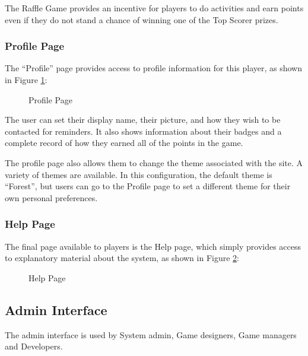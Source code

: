 The Raffle Game provides an incentive for players to do activities and earn points even if they do not stand a chance of winning one of the Top Scorer prizes.

\clearpage

\subsubsection{Profile Page}

The ``Profile'' page provides access to profile information for this player, as shown in Figure \ref{fig:makahiki-profile}:

\begin{figure}[!ht]
\begin{center}
\end{center}
\caption{Profile Page}
\label{fig:makahiki-profile}
\end{figure}

The user can set their display name, their picture, and how they wish to be contacted for reminders. It also shows information about their badges and a complete record of how they earned all of the points in the game.

The profile page also allows them to change the theme associated with the site. A variety of themes are available. In this configuration, the default theme is ``Forest'', but users can go to the Profile page to set a different theme for their own personal preferences. 

\clearpage

\subsubsection{Help Page}

The final page available to players is the Help page, which simply provides access to explanatory material about the system, as shown in Figure \ref{fig:makahiki-help}:

\begin{figure}[!ht]
\begin{center}
\end{center}
\caption{Help Page}
\label{fig:makahiki-help}
\end{figure}

\clearpage

\subsection{Admin Interface}
The admin interface is used by System admin, Game designers, Game managers and Developers.

